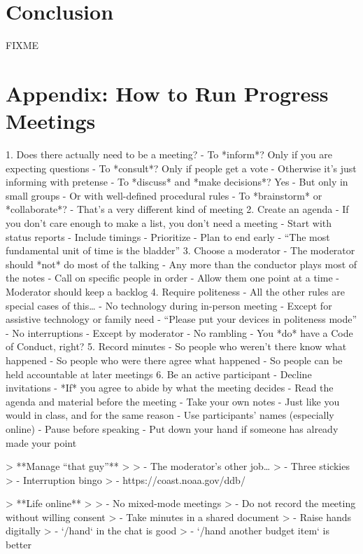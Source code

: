 \documentclass[10pt,letterpaper]{article}
\begin{document}
\section*{Conclusion}

FIXME

\section*{Appendix: How to Run Progress Meetings}

1. Does there actually need to be a meeting?
   - To *inform*? Only if you are expecting questions
   - To *consult*? Only if people get a vote
     - Otherwise it's just informing with pretense
   - To *discuss* and *make decisions*? Yes
     - But only in small groups
     - Or with well-defined procedural rules
   - To *brainstorm* or *collaborate*?
     - That's a very different kind of meeting
2. Create an agenda
   - If you don't care enough to make a list, you don't need a meeting
   - Start with status reports
   - Include timings
   - Prioritize
   - Plan to end early
     - ``The most fundamental unit of time is the bladder''
3. Choose a moderator
   - The moderator should *not* do most of the talking
     - Any more than the conductor plays most of the notes
   - Call on specific people in order
   - Allow them one point at a time
   - Moderator should keep a backlog
4. Require politeness
   - All the other rules are special cases of this{\ldots}
   - No technology during in-person meeting
     - Except for assistive technology or family need
     - ``Please put your devices in politeness mode''
   - No interruptions
     - Except by moderator
   - No rambling
   - You *do* have a Code of Conduct, right?
5. Record minutes
   - So people who weren't there know what happened
   - So people who were there agree what happened
   - So people can be held accountable at later meetings
6. Be an active participant
   - Decline invitations
     - *If* you agree to abide by what the meeting decides
   - Read the agenda and material before the meeting
   - Take your own notes
     - Just like you would in class, and for the same reason \cite{Aiken1975,Bohay2011}
   - Use participants' names (especially online)
   - Pause before speaking
   - Put down your hand if someone has already made your point

> **Manage ``that guy''**
>
> - The moderator's other job{\ldots}
> - Three stickies
> - Interruption bingo
> - https://coast.noaa.gov/ddb/

> **Life online**
>
> - No mixed-mode meetings
> - Do not record the meeting without willing consent
> - Take minutes in a shared document
> - Raise hands digitally
>   - `/hand` in the chat is good
>   - `/hand another budget item` is better
\end{document}
